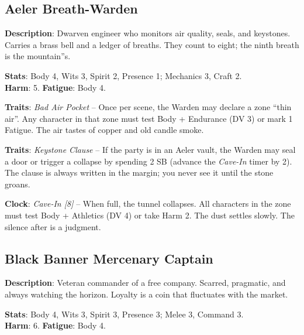 
\subsection*{Aeler Breath-Warden}

\noindent\textbf{Description}: Dwarven engineer who monitors air quality, seals, and keystones. Carries a brass bell and a ledger of breaths. They count to eight; the ninth breath is the mountain''s.

\noindent\textbf{Stats}: Body 4, Wits 3, Spirit 2, Presence 1; Mechanics 3, Craft 2.\\
\textbf{Harm}: 5. \textbf{Fatigue}: Body 4.

\noindent\textbf{Traits}: \emph{Bad Air Pocket} -- Once per scene, the Warden may declare a zone ``thin air''. Any character in that zone must test Body + Endurance (DV 3) or mark 1 Fatigue. The air tastes of copper and old candle smoke.

\noindent\textbf{Traits}: \emph{Keystone Clause} -- If the party is in an Aeler vault, the Warden may seal a door or trigger a collapse by spending 2 SB (advance the \emph{Cave-In} timer by 2). The clause is always written in the margin; you never see it until the stone groans.

\noindent\textbf{Clock}: \emph{Cave-In [8]} -- When full, the tunnel collapses. All characters in the zone must test Body + Athletics (DV 4) or take Harm 2. The dust settles slowly. The silence after is a judgment.


\subsection*{Black Banner Mercenary Captain}

\noindent\textbf{Description}: Veteran commander of a free company. Scarred, pragmatic, and always watching the horizon. Loyalty is a coin that fluctuates with the market.

\noindent\textbf{Stats}: Body 4, Wits 3, Spirit 3, Presence 3; Melee 3, Command 3.\\
\textbf{Harm}: 6. \textbf{Fatigue}: Body 4.


